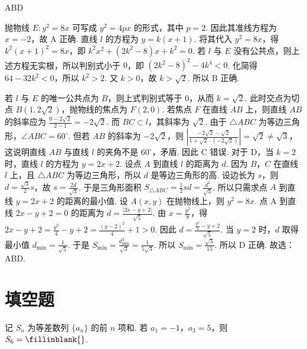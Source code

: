 \documentclass[UTF8,a4paper,oneside,11pt]{ctexbook}
\begin{document}
\begin{answer}
ABD
\end{answer}

\begin{solution}
抛物线 \(E:y^2=8x\) 可写成 \(y^2=4px\) 的形式，其中 \(p=2\). 因此其准线方程为 \(x=-2\)，故 A 正确.
直线 \(l\) 的方程为 \(y=k\left( x+1 \right)\). 将其代入 \(y^2=8x\)，得 \(k^2\left( x+1 \right)^2=8x\)，即 \(k^2x^2+\left( 2k^2-8 \right)x+k^2=0\). 若 \(l\) 与 \(E\) 没有公共点，则上述方程无实根，所以判别式小于 \(0\)，即 \(\left( 2k^2-8 \right)^2-4k^4<0\). 化简得 \(64-32k^2<0\)，所以 \(k^2>2\). 又 \(k>0\)，故 \(k>\sqrt{2}\). 所以 B 正确.

若 \(l\) 与 \(E\) 的唯一公共点为 \(B\)，则上式判别式等于 \(0\)，从而 \(k=\sqrt{2}\). 此时交点为切点 \(B\left( 1,2\sqrt{2} \right)\)，抛物线的焦点为 \(F\left( 2,0 \right)\). 若焦点 \(F\) 在直线 \(AB\) 上，则直线 \(AB\) 的斜率应为 \(\frac{0-2\sqrt{2}}{2-1}=-2\sqrt{2}\). 而 \(BC\subset l\)，其斜率为 \(\sqrt{2}\). 由于 \(\triangle ABC\) 为等边三角形，\(\angle ABC=60^\circ\). 但若 \(AB\) 的斜率为 \(-2\sqrt{2}\)，则 \(\left| \frac{-2\sqrt{2}-\sqrt{2}}{1+\sqrt{2}\cdot \left( -2\sqrt{2} \right)} \right|=\sqrt{2}\ne \sqrt{3}\)，
这说明直线 \(AB\) 与直线 \(l\) 的夹角不是 \(60^\circ\)，矛盾. 因此 C 错误.
对于 D，当 \(k=2\) 时，直线 \(l\) 的方程为 \(y=2x+2\). 设点 \(A\) 到直线 \(l\) 的距离为 \(d\). 因为 \(B\)，\(C\) 在直线 \(l\) 上，且 \(\triangle ABC\) 为等边三角形，所以 \(d\) 是等边三角形的高. 设边长为 \(s\)，则 \(d=\frac{\sqrt{3}}{2}s\)，故 \(s=\frac{2d}{\sqrt{3}}\). 于是三角形面积 \(S_{\triangle ABC}=\frac{1}{2}sd=\frac{d^2}{\sqrt{3}}\). 所以只需求点 \(A\) 到直线 \(y=2x+2\) 的距离的最小值.
设 \(A(x,y)\) 在抛物线上，则 \(y^2=8x\). 点 A 到直线 \(2x-y+2=0\) 的距离为 \(d=\frac{\left| 2x-y+2 \right|}{\sqrt{5}}\). 由 \(x=\frac{y^2}{8}\)，得 \(2x-y+2=\frac{y^2}{4}-y+2=\frac{\left( y-2 \right)^2}{4}+1>0\). 因此 \(d=\frac{\frac{y^2}{4}-y+2}{\sqrt{5}}\). 当 \(y=2\) 时，\(d\) 取得最小值 \(d_{\min}=\frac{1}{\sqrt{5}}\). 于是 \(S_{\min}=\frac{d_{\min}^2}{\sqrt{3}}=\frac{1}{5\sqrt{3}}\). 所以 \(S_{\min}=\frac{\sqrt{3}}{15}\).
所以 D 正确.
故选：ABD.
\end{solution}
\section{填空题}

\begin{problem}
记 \(S_n\) 为等差数列 \(\{a_n\}\) 的前 \(n\) 项和. 若 \(a_1=-1\)，\(a_3=5\)，则 \(S_6=\fillinblank{}\).
\end{problem}
\end{document}
